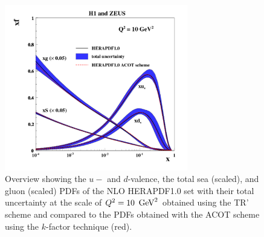 \begin{itemize}
\begin{figure}[!ht]
\centering
\includegraphics[width=8cm]{heraacot}
  \caption{Overview showing the $u-$ and $d$-valence, the total sea
    (scaled), and gluon (scaled) PDFs of the NLO HERAPDF1.0 set \cite{h1zeus:2009wt} 
    with their 
    total uncertainty at the scale of $Q^2 = 10\ \GeV^2$ obtained 
    using the TR' scheme and compared to the PDFs obtained with 
    the ACOT scheme using the $k$-factor technique (red).}
 \label{fig:acotrt}
\end{figure}




\end{itemize}
